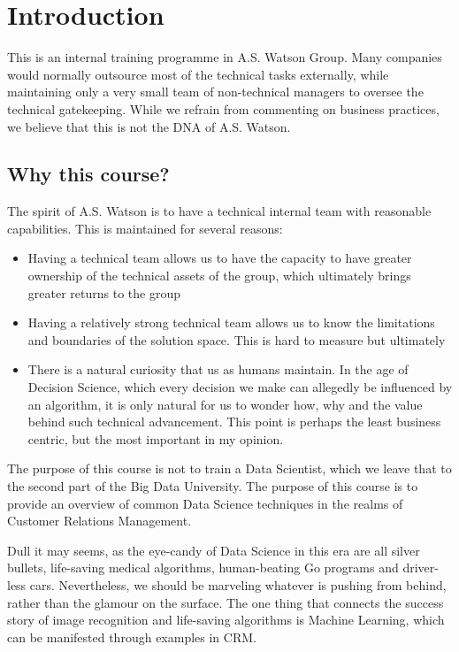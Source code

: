 \section{Introduction}

This is an internal training programme in A.S. Watson Group.  Many companies would normally outsource most of the technical tasks externally, while maintaining only a very small team of non-technical managers to oversee the technical gatekeeping.  While we refrain from commenting on business practices, we believe that this is not the DNA of A.S. Watson.  

\subsection{Why this course?}

The spirit of A.S. Watson is to have a technical internal team with reasonable capabilities.  This is maintained for several reasons:

\begin{itemize}
\item Having a technical team allows us to have the capacity to have greater ownership of the technical assets of the group, which ultimately brings greater returns to the group
\item Having a relatively strong technical team allows us to know the limitations and boundaries of the solution space.  This is hard to measure but ultimately 
\item There is a natural curiosity that us as humans maintain.  In the age of Decision Science, which every decision we make can allegedly be influenced by an algorithm, it is only natural for us to wonder how, why and the value behind such technical advancement.  This point is perhaps the least business centric, but the most important in my opinion.  
\end{itemize}

The purpose of this course is not to train a Data Scientist, which we leave that to the second part of the Big Data University.  The purpose of this course is to provide an overview of common Data Science techniques in the realms of Customer Relations Management.  

Dull it may seems, as the eye-candy of Data Science in this era are all silver bullets, life-saving medical algorithms, human-beating Go programs and driver-less cars.  Nevertheless, we should be marveling whatever is pushing from behind, rather than the glamour on the surface.  The one thing that connects the success story of image recognition and life-saving algorithms is Machine Learning, which can be manifested through examples in CRM.  

